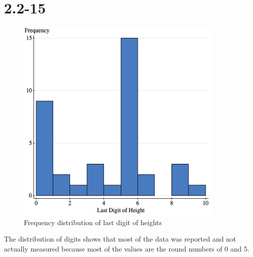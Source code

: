 \documentclass[12pt]{article}
\newcommand{\chapter}{2.2}
\newcommand{\problem}[1]{\vspace{5ex}\section*{\chapter-#1}}
\begin{document}
\problem{15}
\begin{figure}[h]
  \centering
  \includegraphics[width=10cm]{assets/last-digit-of-height.png}
  \caption{Frequency distribution of last digit of heights}
\end{figure}

The distribution of digits shows that most of the data was reported and not actually measured because most of the values are the round numbers of 0 and 5.
\end{document}
